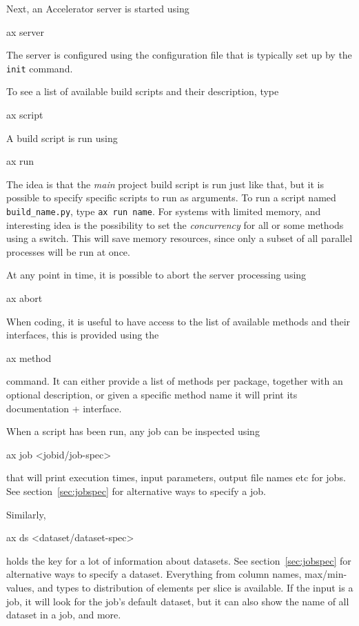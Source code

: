 Next, an Accelerator server is started using
\begin{shell}
ax server
\end{shell}
The server is configured using the configuration file that is
typically set up by the \texttt{init} command.

To see a list of available build scripts and their description, type
\begin{shell}
ax script
\end{shell}

A build script is run using
\begin{shell}
ax run
\end{shell}
The idea is that the \textsl{main} project build script is run just
like that, but it is possible to specify specific scripts to run as
arguments.  To run a script named \texttt{build\_name.py}, type
\texttt{ax run name}.  For systems with limited memory, and
interesting idea is the possibility to set the \textsl{concurrency}
for all or some methods using a switch.  This will save memory
resources, since only a subset of all parallel processes will be run
at once.

At any point in time, it is possible to abort the server processing
using
\begin{shell}
ax abort
\end{shell}

When coding, it is useful to have access to the list of available
methods and their interfaces, this is provided using the
\begin{shell}
ax method
\end{shell}
command.  It can either provide a list of methods per package,
together with an optional description, or given a specific method name
it will print its documentation + interface.

When a script has been run, any job can be inspected using
\begin{shell}
ax job <jobid/job-spec>
\end{shell}
that will print execution times, input parameters, output file names
etc for jobs.  See section~\ref{sec:jobspec} for alternative ways to
specify a job.

Similarly,
\begin{shell}
ax ds <dataset/dataset-spec>
\end{shell}
holds the key for a lot of information about datasets.  See
section~\ref{sec:jobspec} for alternative ways to specify a dataset.
Everything from column names, max/min-values, and types to
distribution of elements per slice is available.  If the input is a
job, it will look for the job's default dataset, but it can also show
the name of all dataset in a job, and more.

